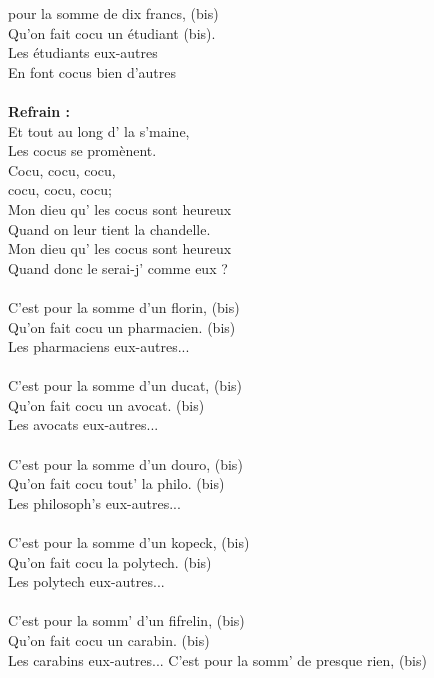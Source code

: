 
 pour la somme de dix francs, (bis)
\\Qu'on fait cocu un étudiant (bis).
\\Les étudiants eux-autres
\\En font cocus bien d'autres
\\\\\textbf{Refrain :}
\\Et tout au long d' la s'maine,
\\Les cocus se promènent.
\\Cocu, cocu, cocu,
\\cocu, cocu, cocu;
\\Mon dieu qu' les cocus sont heureux
\\Quand on leur tient la chandelle.
\\Mon dieu qu' les cocus sont heureux
\\Quand donc le serai-j' comme eux ?
\\\\C'est pour la somme d'un florin, (bis)
\\Qu'on fait cocu un pharmacien. (bis)
\\Les pharmaciens eux-autres...
\\\\C'est pour la somme d'un ducat, (bis)
\\Qu'on fait cocu un avocat. (bis)
\\Les avocats eux-autres...
\\\\C'est pour la somme d'un douro, (bis)
\\Qu'on fait cocu tout' la philo. (bis)
\\Les philosoph's eux-autres...
\\\\C'est pour la somme d'un kopeck, (bis)
\\Qu'on fait cocu la polytech. (bis)
\\Les polytech eux-autres...
\\\\C'est pour la somm' d'un fifrelin, (bis)
\\Qu'on fait cocu un carabin. (bis)
\\Les carabins eux-autres...
\breakpage
C'est pour la somm' de presque rien, (bis)

